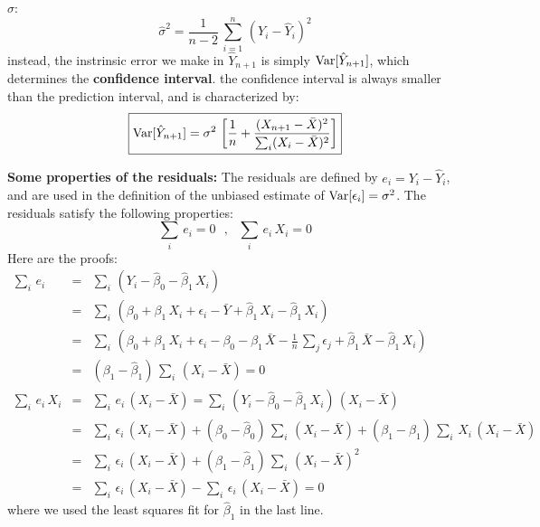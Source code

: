 \documentclass[aps,prl,preprint,superscriptaddress]{revtex4-1}
\begin{document}
$\sigma$:
%
\begin{equation}
{\hat \sigma}^2 = \frac{1}{n-2}\, \sum_{i=1}^n\, \left( Y_i - {\hat Y}_i \right)^2
\end{equation}
% 
instead, the instrinsic error we make in ${\hat Y}_{n+1}$ is simply ${\rm Var}[{\hat Y}_{n+1}]$, which determines
the {\bf confidence interval}. the confidence interval is always smaller than the prediction interval, and 
is characterized by:
%
\begin{equation}
\boxed{
{\rm Var}[{\hat Y}_{n+1}] = \sigma^2\, 
\left[\frac{1}{n} + \frac{(X_{n+1} - {\bar X})^2}{\sum_i (X_i - {\bar X})^2} \right]
}
\end{equation}
%

\vspace{0.5cm}

{\bf Some properties of the residuals:} The residuals are defined by $e_i = Y_i - {\hat Y}_i$, and are
used in the definition of the unbiased estimate of ${\rm Var}[\epsilon_i] = \sigma^2$. 
The residuals satisfy the following properties:
%
\begin{equation}
\boxed{
\sum_i\, e_i = 0 \,\,\,\, , \,\,\,\, \sum_i\, e_i\, X_i = 0
}
\end{equation}
%
Here are the proofs:
%
\begin{eqnarray}
\sum_i\, e_i &=& \sum_i\, \left( Y_i - {\hat \beta}_0 - {\hat \beta}_1\, X_i \right) \nonumber\\
  &=& \sum_i\, \left( \beta_0 + \beta_1\, X_i + \epsilon_i - {\bar Y} + {\hat \beta}_1\, X_i - {\hat \beta}_1\, X_i \right) \nonumber\\
  &=& \sum_i\, \left( \beta_0 + \beta_1\, X_i + \epsilon_i - \beta_0 - \beta_1\, \bar{X} - \frac{1}{n}\, \sum_j \epsilon_j
      + {\hat \beta}_1\, \bar{X} - {\hat \beta}_1\, X_i \right) \nonumber\\
  &=& \left( \beta_1 - {\hat \beta}_1 \right)\, \sum_i\, (X_i - {\bar X}) = 0 \nonumber\\
%
\sum_i\, e_i\, X_i &=& \sum_i\, e_i\, (X_i - {\bar X}) = 
                  \sum_i\, \left( Y_i - {\hat \beta}_0 - {\hat \beta}_1\, X_i \right)\, (X_i - {\bar X}) \nonumber\\
  &=& \sum_i\, \epsilon_i\, (X_i - {\bar X}) + (\beta_0 - {\hat \beta}_0)\, \sum_i\, (X_i - {\bar X}) + 
      (\beta_1 - {\hat \beta}_1)\, \sum_i\, X_i\, (X_i - {\bar X}) \nonumber\\
  &=& \sum_i\, \epsilon_i\, (X_i - {\bar X}) + (\beta_1 - {\hat \beta}_1)\, \sum_i\, (X_i - {\bar X})^2 \nonumber\\ 
  &=& \sum_i\, \epsilon_i\, (X_i - {\bar X}) - \sum_i\, \epsilon_i\, (X_i - {\bar X}) = 0
\end{eqnarray}
%
where we used the least squares fit for ${\hat \beta}_1$ in the last line.
\end{document}
